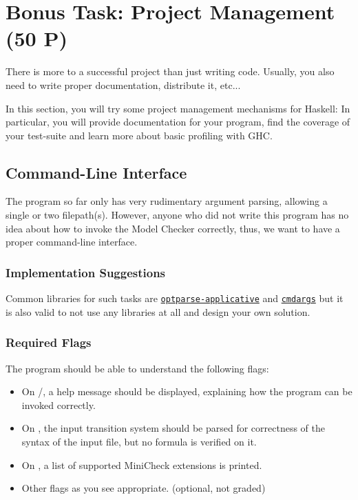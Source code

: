 \documentclass{article}
\begin{document}
\clearpage

\section{Bonus Task: Project Management (50 P)}
\label{sec-bonus}

There is more to a successful project than just writing code. 
Usually, you also need to write proper documentation, distribute it, etc...

In this section, you will try some project management mechanisms for Haskell: 
In particular, you will provide documentation for your program, 
find the coverage of your test-suite and learn more about basic profiling with GHC.

\subsection{Command-Line Interface}

The program so far only has very rudimentary argument parsing, allowing a single or two filepath(s). 
However, anyone who did not write this program has no idea about how to invoke the Model Checker correctly, 
thus, we want to have a proper command-line interface.

\subsubsection*{Implementation Suggestions}

Common libraries for such tasks are \href{https://hackage.haskell.org/package/optparse-applicative}{\texttt{optparse-applicative}} 
and \href{https://hackage.haskell.org/package/cmdargs}{\texttt{cmdargs}} but it is also valid to not use any libraries at all 
and design your own solution.

\subsubsection*{Required Flags}

The program should be able to understand the following flags:

\begin{itemize}
\item On /, a help message should be displayed, explaining how the program can be invoked correctly.
\item On , the input transition system should be parsed for correctness of the syntax of the input file, but no formula is verified on it.
\item On , a list of supported MiniCheck extensions is printed.
\item Other flags as you see appropriate. (optional, not graded)
\end{itemize}
\end{document}
